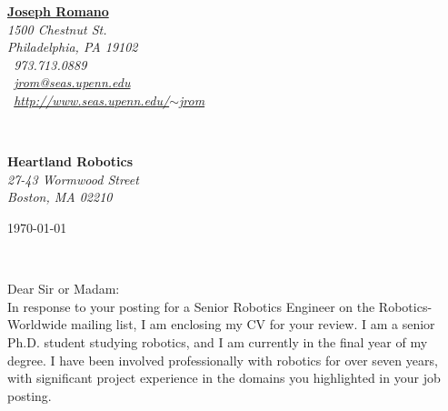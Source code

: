 \documentclass[11pt]{article}
\begin{document}
\hfill%
\begin{minipage}[t]{.6\textwidth}
\raggedleft%
{\bfseries \href{http://www.seas.upenn.edu/~jrom}{Joseph Romano}}\\[.35ex]
\small\itshape%
1500 Chestnut St.\\
Philadelphia, PA 19102\\[.35ex]
\Telefon~973.713.0889\\
\Letter~\href{mailto:jrom@seas.upenn.edu}{jrom@seas.upenn.edu}\\
{\Large\ComputerMouse}  ~\href{http://www.seas.upenn.edu/~jrom}{http://www.seas.upenn.edu/$\sim$jrom}
\end{minipage}\\[1em]
%
\begin{minipage}[t]{.4\textwidth}
\raggedright%
{\bfseries Heartland Robotics}\\[.35ex]
\small\itshape%
27-43 Wormwood Street\\
Boston, MA 02210
\end{minipage}
\hfill %
\begin{minipage}[t]{.4\textwidth}
\raggedleft %
\today
\end{minipage}\\[2em]
\raggedright
Dear Sir or Madam:\\[1.5em]
%

In response to your posting for a Senior Robotics Engineer on the Robotics-Worldwide mailing list, I am enclosing my CV for your review. I am a senior Ph.D. student studying robotics, and I am currently in the final year of my degree. I have been involved professionally with robotics for over seven years, with significant project experience in the domains you highlighted in your job posting.

\end{document}
